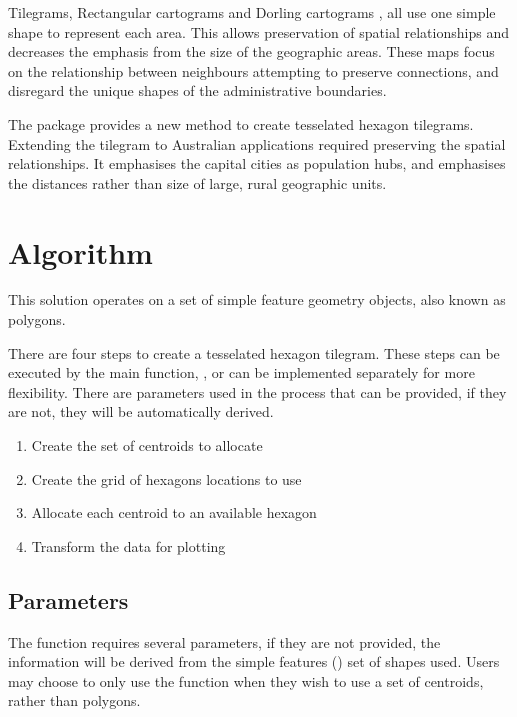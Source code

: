 \documentclass[
]{jss}
\providecommand{\tightlist}{%
  \setlength{\itemsep}{0pt}\setlength{\parskip}{0pt}}
\begin{document}
Tilegrams, Rectangular cartograms \citep{ORC} and Dorling cartograms
\citep{ACTUC}, all use one simple shape to represent each area. This
allows preservation of spatial relationships and decreases the emphasis
from the size of the geographic areas. These maps focus on the
relationship between neighbours attempting to preserve connections, and
disregard the unique shapes of the administrative boundaries.

The  package provides a new method to create tesselated
hexagon tilegrams. Extending the tilegram to Australian applications
required preserving the spatial relationships. It emphasises the capital
cities as population hubs, and emphasises the distances rather than size
of large, rural geographic units.

\hypertarget{algorithm}{%
\section{Algorithm}\label{algorithm}}

This solution operates on a set of simple feature geometry objects, also
known as  \citep{sf} polygons.

There are four steps to create a tesselated hexagon tilegram. These
steps can be executed by the main function, , or can
be implemented separately for more flexibility. There are parameters
used in the process that can be provided, if they are not, they will be
automatically derived.

\begin{enumerate}
\def\labelenumi{\arabic{enumi}.}
\tightlist
\item
  Create the set of centroids to allocate
\item
  Create the grid of hexagons locations to use
\item
  Allocate each centroid to an available hexagon
\item
  Transform the data for plotting
\end{enumerate}

\hypertarget{parameters}{%
\subsection{Parameters}\label{parameters}}

The  function requires several parameters, if they
are not provided, the information will be derived from the simple
features () set of shapes used. Users may choose to only use the
 function when they wish to use a set of centroids,
rather than  polygons.
\end{document}
